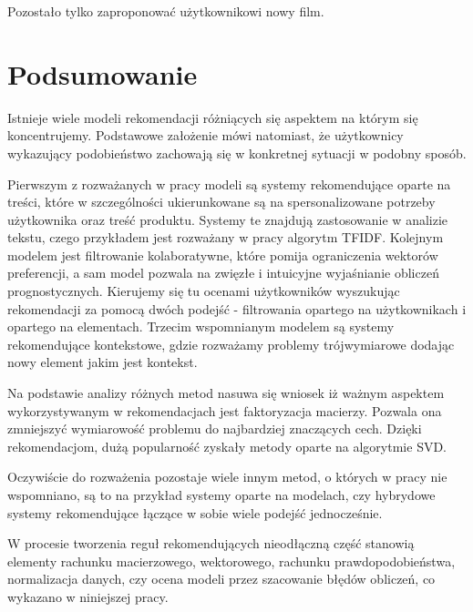 \documentclass[12pt,a4paper]{report}
\begin{document}
Pozostało tylko zaproponować użytkownikowi nowy film.


\chapter{Podsumowanie}

Istnieje wiele modeli rekomendacji różniących się aspektem na którym się koncentrujemy. Podstawowe założenie mówi natomiast, że użytkownicy wykazujący podobieństwo zachowają się w konkretnej sytuacji w podobny sposób.

Pierwszym z rozważanych w pracy modeli są systemy rekomendujące oparte na treści, które w szczególności ukierunkowane są na spersonalizowane potrzeby użytkownika oraz treść produktu. Systemy te znajdują zastosowanie w analizie tekstu, czego przykładem jest rozważany w pracy algorytm TFIDF. Kolejnym modelem jest filtrowanie kolaboratywne, które pomija ograniczenia wektorów preferencji, a sam model pozwala na zwięzłe i intuicyjne wyjaśnianie obliczeń prognostycznych. Kierujemy się tu ocenami użytkowników wyszukując rekomendacji za pomocą dwóch podejść - filtrowania opartego na użytkownikach i opartego na elementach. Trzecim wspomnianym modelem są systemy rekomendujące kontekstowe, gdzie rozważamy problemy trójwymiarowe dodając nowy element jakim jest kontekst.

Na podstawie analizy różnych metod nasuwa się wniosek iż ważnym aspektem wykorzystywanym w rekomendacjach jest faktoryzacja macierzy. Pozwala ona zmniejszyć wymiarowość problemu do najbardziej znaczących cech. Dzięki rekomendacjom, dużą popularność zyskały metody oparte na algorytmie SVD.

Oczywiście do rozważenia pozostaje wiele innym metod, o których w pracy nie wspomniano, są to na przykład systemy oparte na modelach, czy hybrydowe systemy rekomendujące łączące w sobie wiele podejść jednocześnie.

W procesie tworzenia reguł rekomendujących nieodłączną część stanowią elementy rachunku macierzowego, wektorowego, rachunku prawdopodobieństwa, normalizacja danych, czy ocena modeli przez szacowanie błędów obliczeń, co wykazano w niniejszej pracy. 




\end{document}
